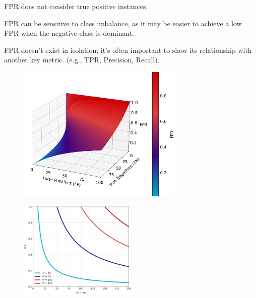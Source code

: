 {
\item FPR does not consider true positive instances.
\item FPR can be sensitive to class imbalance, as it may be easier to achieve a low FPR when the negative class is dominant.
\item FPR doesn't exist in isolation; it's often important to show its relationship with another key metric. (e.g., TPR, Precision, Recall).
}


\clearpage
\thispagestyle{customstyle2}


\begin{figure}[ht!]
    \centering
    \includegraphics[width=0.7\textwidth]{figures/FPR_3d_surface.png}
    \label{fig1}
\end{figure}

\begin{figure}
    \centering
    \vspace{-20pt} %
    \includegraphics[width=0.5\textwidth]{figures/FPR_2d_line_plot.png} %
\end{figure}

